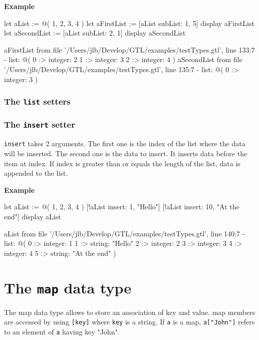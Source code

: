 \documentclass[10pt,openright,twosides]{report}
\newcommand{\gtltype}[1]{{\small\ttfamily #1}}
\newcommand{\scst}[1]{{\footnotesize\ttfamily\colorbox{light-blue}{"#1"}}}
\newcommand{\gtlarg}[1]{{\footnotesize\ttfamily\colorbox{light-blue}{#1}}}
\newcommand{\gtlinline}[1]{\colorbox{light-blue}{\lstinline[language=gtl]{#1}}}
\newcommand{\example}{\vspace{.75em}\noindent\textbf{Example}\vspace{0em}}
\begin{document}
\example
\begin{gtl}
let aList := @( 1, 2, 3, 4 )
let aFirstList := [aList subList: 1, 5]
display aFirstList
let aSecondList := [aList subList: 2, 1]
display aSecondList
\end{gtl}
\begin{console}
aFirstList from file '/Users/jlb/Develop/GTL/examples/testTypes.gtl', line 133:7
  - list: @(
    0 :>
        integer: 2
    1 :>
        integer: 3
    2 :>
        integer: 4
)
aSecondList from file '/Users/jlb/Develop/GTL/examples/testTypes.gtl', line 135:7
  - list: @(
    0 :>
        integer: 3
)
\end{console}

\subsubsection{The \texttt{list} setters}

\subsubsection{The \texttt{insert} setter}

\gtlinline{insert} takes 2 arguments. The first one is the \gtlarg{index} of the list where the data will be inserted. The second one is the \gtlarg{data} to insert. It inserts \gtlarg{data} before the item at \gtlarg{index}. If \gtlarg{index} is greater than or equals the length of the list, \gtlarg{data} is appended to the list.

\example
\begin{gtl}
let aList := @( 1, 2, 3, 4 )
[!aList insert: 1, "Hello"]
[!aList insert: 10, "At the end"]
display aList
\end{gtl}
\begin{console}
aList from file '/Users/jlb/Develop/GTL/examples/testTypes.gtl', line 140:7
  - list: @(
    0 :>
        integer: 1
    1 :>
        string: "Hello"
    2 :>
        integer: 2
    3 :>
        integer: 3
    4 :>
        integer: 4
    5 :>
        string: "At the end"
)
\end{console}

\section{The \texttt{map} data type}

The \gtltype{map} data type allows to store an association of key and value. \gtltype{map} members are accessed by using \gtlinline{[key]} where \gtlinline{key} is a \gtltype{string}. If \gtlinline{a} is a \gtltype{map}, \gtlinline{a["John"]} refers to an element of \gtlinline{a} having key \scst{John}.
\end{document}
